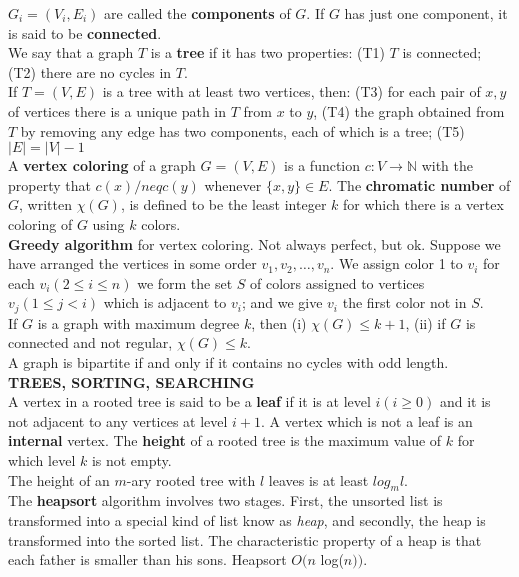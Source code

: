 \documentclass[10pt,landscape]{article}
\begin{document}
\begin{multicols}{4}
$G_{i} = (V_{i}, E_{i})$ are called the \textbf{components} of $G$. If
$G$ has just one component, it is said to be \textbf{connected}.\\
We say that a graph $T$ is a \textbf{tree} if it has two properties:
(T1) $T$ is connected; (T2) there are no cycles in $T$.\\
If $T = (V,E)$ is a tree with at least two vertices, then: (T3) for
each pair of $x,y$ of vertices there is a unique path in $T$ from $x$
to $y$, (T4) the graph obtained from $T$ by removing any edge has two
components, each of which is a tree; (T5) $|E| = |V|-1$\\
A \textbf{vertex coloring} of a graph $G = (V,E)$ is a function $c: V
\to \mathbb{N}$ with the property that $c(x) /neq c(y)$ whenever
$\{x,y\} \in E$. The \textbf{chromatic number} of $G$, written
$\chi(G)$, is defined to be the least integer $k$ for which there is a
vertex coloring of $G$ using $k$ colors.\\
\textbf{Greedy algorithm} for vertex coloring. Not always perfect, but
ok. Suppose we have arranged the vertices in some order $v_{1}, v_{2},
\dots ,v_{n}$. We assign color 1 to $v_{i}$ for each $v_{i}(2 \leq i
\leq n)$ we form the set $S$ of colors assigned to vertices $v_{j}(1
\leq j < i)$ which is adjacent to $v_{i}$; and we give $v_{i}$ the
first color not in $S$.\\
If $G$ is a graph with maximum degree $k$, then (i) $\chi(G) \leq k +
1$, (ii) if $G$ is connected and not regular, $\chi(G) \leq k$.\\
A graph is bipartite if and only if it contains no cycles with odd length.\\
\textbf{TREES, SORTING, SEARCHING}\\
A vertex in a rooted tree is said to be a \textbf{leaf} if it is at
level $i (i \geq 0)$ and it is not adjacent to any vertices at level
$i + 1$. A vertex which is not a leaf is an \textbf{internal}
vertex. The \textbf{height} of a rooted tree is the maximum value of
$k$ for which level $k$ is not empty.\\
The height of an $m$-ary rooted tree with $l$ leaves is at least
$log_{m}l$.\\
The \textbf{heapsort} algorithm involves two stages. First, the
unsorted list is transformed into a special kind of list know as
\textit{heap}, and secondly, the heap is transformed into the sorted
list. The characteristic property of a heap is that each father is
smaller than his sons. Heapsort $O(n$ log($n))$.\\

\end{multicols}
\end{document}
